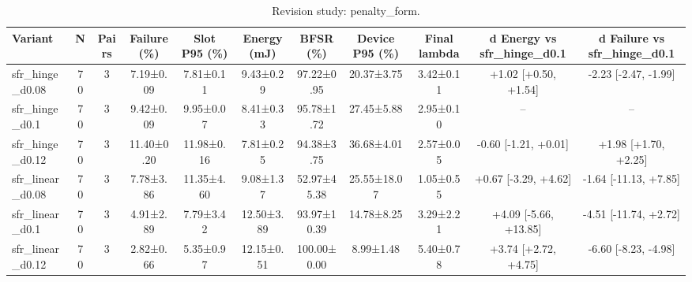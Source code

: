 \begin{table}[t]
\centering
\caption{Revision study: penalty_form.}
\label{tab:rev_penalty_form}
\footnotesize
\setlength{\tabcolsep}{3pt}
\begin{tabular}{lcccccccccc}
\hline
Variant & N & Pairs & Failure (\%) & Slot P95 (\%) & Energy (mJ) & BFSR (\%) & Device P95 (\%) & Final lambda & d Energy vs sfr\_hinge\_d0.1 & d Failure vs sfr\_hinge\_d0.1 \\
\hline
sfr\_hinge\_d0.08 & 70 & 3 & 7.19±0.09 & 7.81±0.11 & 9.43±0.29 & 97.22±0.95 & 20.37±3.75 & 3.42±0.11 & +1.02 [+0.50, +1.54] & -2.23 [-2.47, -1.99] \\
sfr\_hinge\_d0.1 & 70 & 3 & 9.42±0.09 & 9.95±0.07 & 8.41±0.33 & 95.78±1.72 & 27.45±5.88 & 2.95±0.10 & -- & -- \\
sfr\_hinge\_d0.12 & 70 & 3 & 11.40±0.20 & 11.98±0.16 & 7.81±0.25 & 94.38±3.75 & 36.68±4.01 & 2.57±0.05 & -0.60 [-1.21, +0.01] & +1.98 [+1.70, +2.25] \\
sfr\_linear\_d0.08 & 70 & 3 & 7.78±3.86 & 11.35±4.60 & 9.08±1.37 & 52.97±45.38 & 25.55±18.07 & 1.05±0.55 & +0.67 [-3.29, +4.62] & -1.64 [-11.13, +7.85] \\
sfr\_linear\_d0.1 & 70 & 3 & 4.91±2.89 & 7.79±3.42 & 12.50±3.89 & 93.97±10.39 & 14.78±8.25 & 3.29±2.21 & +4.09 [-5.66, +13.85] & -4.51 [-11.74, +2.72] \\
sfr\_linear\_d0.12 & 70 & 3 & 2.82±0.66 & 5.35±0.97 & 12.15±0.51 & 100.00±0.00 & 8.99±1.48 & 5.40±0.78 & +3.74 [+2.72, +4.75] & -6.60 [-8.23, -4.98] \\
\hline
\end{tabular}
\end{table}
